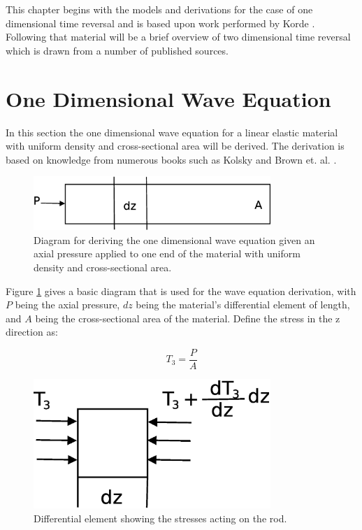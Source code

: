 This chapter begins with the models and derivations for the case of one dimensional time reversal and is based upon work performed by Korde \cite{Fehrman2012}. Following that material will be a brief overview of two dimensional time reversal which is drawn from a number of published sources.

\section{One Dimensional Wave Equation}
\label{sec:oneDWaveEquation}

In this section the one dimensional wave equation for a linear elastic material with uniform density and cross-sectional area will be derived. The derivation is based on knowledge from numerous books such as Kolsky \cite{Kolsky1963} and Brown et. al. \cite{Brown2008}.

\begin{figure}[ht!]
\centering
\includegraphics[width=0.8\textwidth]{eps_pics/deriveWaveRod}
\caption{Diagram for deriving the one dimensional wave equation given an axial pressure applied to one end of the material with uniform density and cross-sectional area.
	 \label{fig:deriveWaveRod}} 
\end{figure}

Figure \ref{fig:deriveWaveRod} gives a basic diagram that is used for the wave equation derivation, with $P$ being the axial pressure, $dz$ being the material's differential element of length, and $A$ being the cross-sectional area of the material. Define the stress in the z direction as:

\begin{equation}
T_3 = \frac{P}{A}
\end{equation}


\begin{figure}[ht!]
\centering
\includegraphics[width=0.8\textwidth]{eps_pics/diffElementRod}
\caption{Differential element showing the stresses acting on the rod.
	 \label{fig:diffElementRod}} 
\end{figure}

